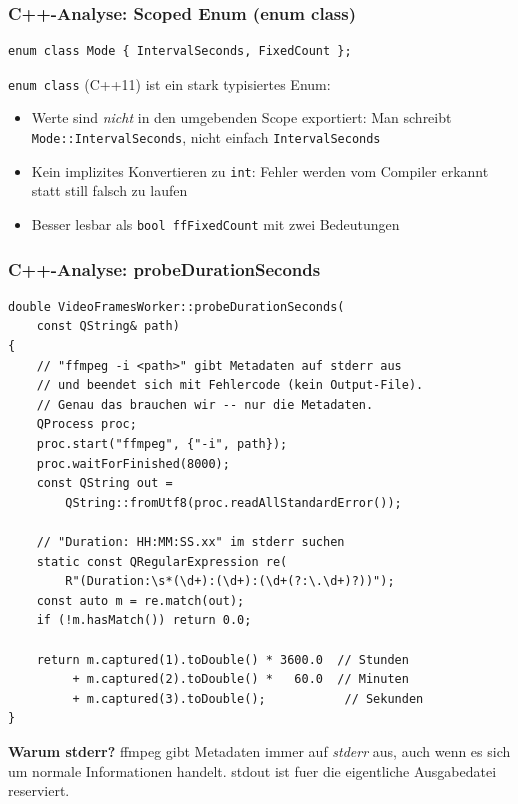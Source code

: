 \subsubsection{C++-Analyse: Scoped Enum (enum class)}

\begin{lstlisting}
enum class Mode { IntervalSeconds, FixedCount };
\end{lstlisting}

\verb|enum class| (C++11) ist ein stark typisiertes Enum:
\begin{itemize}[noitemsep]
  \item Werte sind \emph{nicht} in den umgebenden Scope
    exportiert: Man schreibt
    \verb|Mode::IntervalSeconds|, nicht einfach
    \verb|IntervalSeconds|
  \item Kein implizites Konvertieren zu \verb|int|:
    Fehler werden vom Compiler erkannt statt still
    falsch zu laufen
  \item Besser lesbar als \verb|bool ffFixedCount|
    mit zwei Bedeutungen
\end{itemize}

\subsubsection{C++-Analyse: probeDurationSeconds}

\begin{lstlisting}[caption={probeDurationSeconds: ffmpeg-Stderr parsen}]
double VideoFramesWorker::probeDurationSeconds(
    const QString& path)
{
    // "ffmpeg -i <path>" gibt Metadaten auf stderr aus
    // und beendet sich mit Fehlercode (kein Output-File).
    // Genau das brauchen wir -- nur die Metadaten.
    QProcess proc;
    proc.start("ffmpeg", {"-i", path});
    proc.waitForFinished(8000);
    const QString out =
        QString::fromUtf8(proc.readAllStandardError());

    // "Duration: HH:MM:SS.xx" im stderr suchen
    static const QRegularExpression re(
        R"(Duration:\s*(\d+):(\d+):(\d+(?:\.\d+)?))");
    const auto m = re.match(out);
    if (!m.hasMatch()) return 0.0;

    return m.captured(1).toDouble() * 3600.0  // Stunden
         + m.captured(2).toDouble() *   60.0  // Minuten
         + m.captured(3).toDouble();           // Sekunden
}
\end{lstlisting}

\textbf{Warum stderr?} ffmpeg gibt Metadaten immer auf
\emph{stderr} aus, auch wenn es sich um normale
Informationen handelt. stdout ist fuer die eigentliche
Ausgabedatei reserviert.

